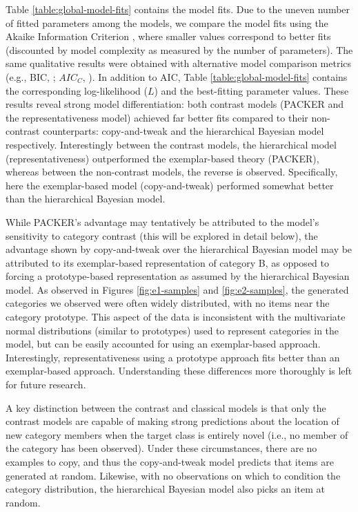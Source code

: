 \documentclass[12pt]{article}
\begin{document}
\begin{flushleft}
Table \ref{table:global-model-fits} contains the model fits. Due to the uneven number of fitted parameters among the models, we
compare the model fits using the Akaike Information Criterion
\citep[AIC;][]{akaike1974new}, where smaller values correspond to better fits
(discounted by model complexity as measured by the number of parameters). The
same qualitative results were obtained with alternative model comparison metrics
(e.g., BIC, \citealp{schwarz1978estimating}; $AIC_C$,
\citealp{hurvich1989regression}). In addition to AIC, Table \ref{table:global-model-fits} contains the corresponding log-likelihood ($L$) and the best-fitting
parameter values. These results reveal strong model differentiation: both
contrast models (PACKER and the representativeness model) achieved far better
fits compared to their non-contrast counterparts: copy-and-tweak and the
hierarchical Bayesian model respectively. Interestingly between the contrast
models, the hierarchical model (representativeness) outperformed the
exemplar-based theory (PACKER), whereas between the non-contrast models, the
reverse is observed. Specifically, here the exemplar-based model
(copy-and-tweak) performed somewhat better than the hierarchical Bayesian model.

While PACKER's advantage may tentatively be attributed to the model's
sensitivity to category contrast (this will be explored in detail below), the
advantage shown by copy-and-tweak over the hierarchical Bayesian model may be
attributed to its exemplar-based representation of category B, as opposed to forcing a
prototype-based representation as assumed by the hierarchical Bayesian model. As
observed in Figures \ref{fig:e1-samples} and \ref{fig:e2-samples}, the generated
categories we observed were often widely distributed, with no items near the
category prototype. This aspect of the data is inconsistent with the
multivariate normal distributions (similar to prototypes) used to represent
categories in the \cite{jern2013probabilistic} model, but can be easily
accounted for using an exemplar-based approach. Interestingly, representativeness using a prototype approach fits better than an exemplar-based approach. Understanding these differences more thoroughly is left for future research.

A key distinction between the contrast and classical models is that only the
contrast models are capable of making strong predictions about the location of
new category members when the target class is entirely novel (i.e., no member of
the category has been observed). Under these circumstances, there are no
examples to copy, and thus the copy-and-tweak model predicts that items are
generated at random. Likewise, with no observations on which to condition the
category distribution, the hierarchical Bayesian model also picks an item at
random.


\end{flushleft}
\end{document}
